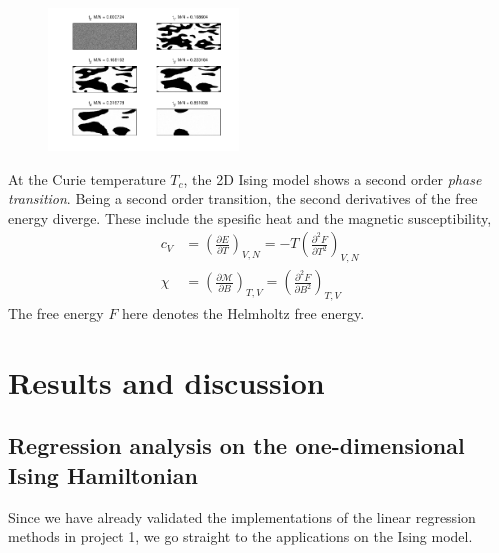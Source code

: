 \documentclass[a4paper, twocolumn]{article}
\begin{document}
\begin{figure}
  \centering
  \includegraphics[width=0.45\textwidth]{ising_metropolis.pdf}
\end{figure}

At the Curie temperature $T_c$, the 2D Ising model shows a second order \textit{phase transition}. Being a second order transition, the second derivatives of the free energy diverge. These include the spesific heat and the magnetic susceptibility,
\begin{align}
c_V &= \left(\frac{\partial E}{\partial T}\right)_{V,N} = -T\left(\frac{\partial^2 F}{\partial T^2}\right)_{V,N} \nonumber \\
\chi &= \left(\frac{\partial \mathcal{M}}{\partial B}\right)_{T,V}=\left(\frac{\partial^2 F}{\partial B^2}\right)_{T,V} \nonumber 
\end{align} 
The free energy $F$ here denotes the Helmholtz free energy.

\section{Results and discussion}
\subsection{Regression analysis on the one-dimensional Ising Hamiltonian \label{sect:1d_results}}
Since we have already validated the implementations of the linear regression methods in project 1, we go straight to the applications on the Ising model.
\end{document}
